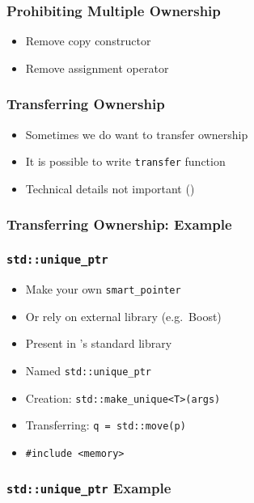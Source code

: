 \begin{frame}
  \frametitle{Prohibiting Multiple Ownership}
  \begin{itemize}
    \item Remove copy constructor
    \item Remove assignment operator
  \end{itemize}
\end{frame}

\begin{frame}
  \frametitle{Transferring Ownership}
  \begin{itemize}
    \item Sometimes we do want to transfer ownership
    \item It is possible to write {\tt transfer} function
    \item Technical details not important ()
  \end{itemize}
\end{frame}

\begin{frame}
  \frametitle{Transferring Ownership: Example}
\end{frame}

\begin{frame}
  \frametitle{\tt std::unique\_ptr}
  \begin{itemize}
    \item Make your own {\tt smart\_pointer}
    \item Or rely on external library (e.g.~Boost)
  \end{itemize}
  \vskip5mm
  \begin{itemize}
    \item Present in \cpp's standard library
    \item Named {\tt std::unique\_ptr}
    \item Creation: {\tt std::make\_unique<T>(args)}
    \item Transferring: {\tt q = std::move(p)}
    \item {\tt \#include <memory>}
  \end{itemize}
\end{frame}

\begin{frame}
  \frametitle{{\tt std::unique\_ptr} Example}
\end{frame}

